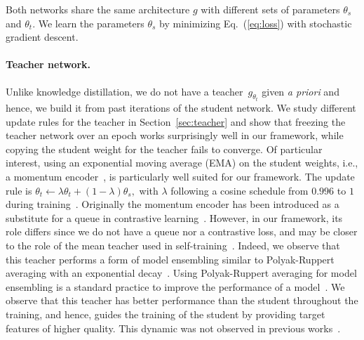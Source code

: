 Both networks share the same architecture $g$ with different sets of parameters $\theta_s$ and $\theta_t$.
We learn the parameters $\theta_s$ by minimizing Eq.~(\ref{eq:loss}) with stochastic gradient descent.

\paragraph{Teacher network.}
Unlike knowledge distillation, we do not have a teacher~$g_{\theta_t}$ given \emph{a priori} and hence, we build it from past iterations of the student network.
We study different update rules for the teacher in Section~\ref{sec:teacher} and show that freezing the teacher network over an epoch works surprisingly well in our framework, while copying the student weight for the teacher fails to converge.
Of particular interest, using an exponential moving average (EMA) on the student weights, i.e., a momentum encoder~\cite{he2020momentum}, is particularly well suited for our framework. 
The update rule is $ \theta_t \leftarrow \lambda \theta_t + (1-\lambda) \theta_s,$ with $\lambda$ following a cosine schedule from $0.996$ to $1$ during training~\cite{grill2020bootstrap}.
Originally the momentum encoder has been introduced as a substitute for a queue in contrastive learning~\cite{he2020momentum}.
However, in our framework, its role differs since we do not have a queue nor a contrastive loss, and may be closer to the role of the mean teacher used in self-training~\cite{tarvainen2017mean}.
Indeed, we observe that this teacher performs a form of model ensembling similar to Polyak-Ruppert averaging with an exponential decay~\cite{polyak1992acceleration, ruppert1988efficient}.
Using Polyak-Ruppert averaging for model ensembling is a standard practice to improve the performance of a model~\cite{jean2014using}.
We observe that this teacher has better performance than the student throughout the training, and hence, guides the training of the student by providing target features of higher quality.
This dynamic was not observed in previous works~\cite{grill2020bootstrap, richemond2020byol}.
